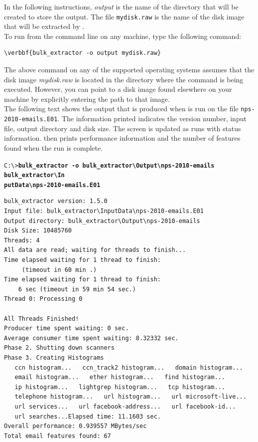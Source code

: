 \documentclass[11pt]{article} %
\begin{document}
In the following instructions, \textit{output} is the name of the directory that will be created to store the \bulk output. The file \texttt{mydisk.raw} is the name of the disk image that will be extracted by \bulk. \\

To run \bulk from the command line on any machine, type the following command:
\begin{Verbatim}[commandchars=\\\{\}]
\verbbf{bulk_extractor -o output mydisk.raw}
\end{Verbatim}

The above command on any of the supported operating systems assumes that the disk image \textit{mydisk.raw} is located in the directory where the command is being executed. However, you can point \bulk to a disk image found elsewhere on your machine by explicitly entering the path to that image.\\

The following text shows the output that is produced when \bulk is run on the file \texttt{nps-2010-emails.E01}. The information printed indicates the version number, input file, output directory and disk size. The screen is updated as \bulk runs  with status information. \bulk then prints performance information and the number of features found when the run is complete.

\begingroup
\footnotesize
\texttt{C:\textbackslash \textgreater \textbf{bulk\_extractor -o bulk\_extractor\textbackslash Output\textbackslash nps-2010-emails bulk\_extractor\textbackslash In\\putData\textbackslash nps-2010-emails.E01}}
\endgroup
\begingroup
\footnotesize
\begin{Verbatim}[fontfamily=courier]
bulk_extractor version: 1.5.0
Input file: bulk_extractor\InputData\nps-2010-emails.E01
Output directory: bulk_extractor\Output\nps-2010-emails
Disk Size: 10485760
Threads: 4
All data are read; waiting for threads to finish...
Time elapsed waiting for 1 thread to finish:
     (timeout in 60 min .)
Time elapsed waiting for 1 thread to finish:
    6 sec (timeout in 59 min 54 sec.)
Thread 0: Processing 0

All Threads Finished!
Producer time spent waiting: 0 sec.
Average consumer time spent waiting: 8.32332 sec.
Phase 2. Shutting down scanners
Phase 3. Creating Histograms
   ccn histogram...   ccn_track2 histogram...   domain histogram...
   email histogram...   ether histogram...   find histogram...
   ip histogram...   lightgrep histogram...   tcp histogram...
   telephone histogram...   url histogram...   url microsoft-live...
   url services...   url facebook-address...   url facebook-id...
   url searches...Elapsed time: 11.1603 sec.
Overall performance: 0.939557 MBytes/sec
Total email features found: 67
\end{Verbatim}
\endgroup
\end{document}
